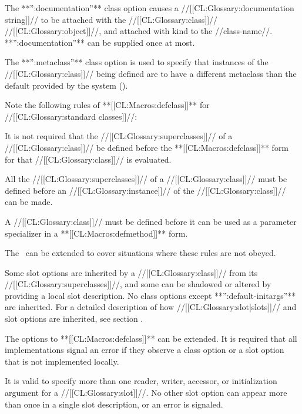 \itemitem{\bull}

The **'':documentation''** class option causes a //[[CL:Glossary:documentation string]]// to be attached with the //[[CL:Glossary:class]]// //[[CL:Glossary:object]]//, and attached with kind  to the //class-name//. **'':documentation''** can be supplied once at most.

\itemitem{\bull} The **'':metaclass''** class option is used to specify that instances of the //[[CL:Glossary:class]]// being defined are to have a different metaclass than the default provided by the system ().

\endlist

Note the following rules of **[[CL:Macros:defclass]]** for //[[CL:Glossary:standard classes]]//:

\beginlist

\itemitem{\bull} It is not required that the //[[CL:Glossary:superclasses]]// of a //[[CL:Glossary:class]]// be defined before the **[[CL:Macros:defclass]]** form for that //[[CL:Glossary:class]]// is evaluated.

\itemitem{\bull} All the //[[CL:Glossary:superclasses]]// of a //[[CL:Glossary:class]]// must be defined before an //[[CL:Glossary:instance]]// of the //[[CL:Glossary:class]]// can be made.

\itemitem{\bull} A //[[CL:Glossary:class]]// must be defined before it can be used as a parameter specializer in a **[[CL:Macros:defmethod]]** form.

\endlist

The \OS\ can be extended to cover situations where these rules are not obeyed.

Some slot options are inherited by a //[[CL:Glossary:class]]// from its //[[CL:Glossary:superclasses]]//, and some can be shadowed or altered by providing a local slot description. No class options except **'':default-initargs''** are inherited. For a detailed description of how //[[CL:Glossary:slot|slots]]// and slot options are inherited, see section {\secref\SlotInheritance}.

The options to **[[CL:Macros:defclass]]** can be extended. It is required that all implementations signal an error if they observe a class option or a slot option that is not implemented locally.

It is valid to specify more than one reader, writer, accessor, or initialization argument for a //[[CL:Glossary:slot]]//. No other slot option can appear more than once in a single slot description, or an error is signaled.

